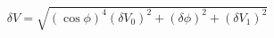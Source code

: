 \begin{equation}
\label{eq:delta_V_Malus}
\delta V = \sqrt{ \left(\cos{\phi}\right)^4(\delta V_0)^2 + (\delta \phi)^2+ (\delta V_1)^2}
\end{equation}
